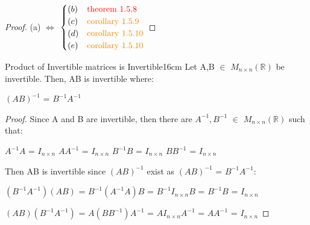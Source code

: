     \begin{proof}
        (a) $\Leftrightarrow$
        $\begin{cases}
            (b) & {\color{red} \text{theorem 1.5.8}} \\
            (c) & {\color{orange} \text{corollary 1.5.9}} \\
            (d) & {\color{orange} \text{corollary 1.5.10}} \\
            (e) & {\color{orange} \text{corollary 1.5.10}}
        \end{cases}$
    \end{proof}

    \vspace{0.5cm}



    \begin{wtheorem}{Product of Invertible matrices is Invertible}{16cm}
        Let A,B $\in$ $M_{n \times n}(\mathbb{R})$ be invertible.
        Then, AB is invertible where:

        \hspace{0.5cm}
        $(AB)^{-1}$ = $B^{-1}A^{-1}$
    \end{wtheorem}

    \begin{proof}
        Since A and B are invertible, then there are
        $A^{-1},B^{-1}$ $\in$ $M_{n \times n}(\mathbb{R})$ such that:

        \hspace{0.5cm}
        $A^{-1}A$ = $I_{n \times n}$
        \hspace{1cm}
        $AA^{-1}$ = $I_{n \times n}$
        \hspace{2cm}
        $B^{-1}B$ = $I_{n \times n}$
        \hspace{1cm}
        $BB^{-1}$ = $I_{n \times n}$

        Then AB is invertible since $(AB)^{-1}$ exist
        as $(AB)^{-1}$ = $B^{-1}A^{-1}$:

        \hspace{0.5cm}
        $(B^{-1}A^{-1})(AB)$
        = $B^{-1}(A^{-1}A)B$
        = $B^{-1}I_{n \times n}B$
        = $B^{-1}B$
        = $I_{n \times n}$

        \hspace{0.5cm}
        $(AB)(B^{-1}A^{-1})$
        = $A(BB^{-1})A^{-1}$
        = $AI_{n \times n}A^{-1}$
        = $AA^{-1}$
        = $I_{n \times n}$
    \end{proof}

